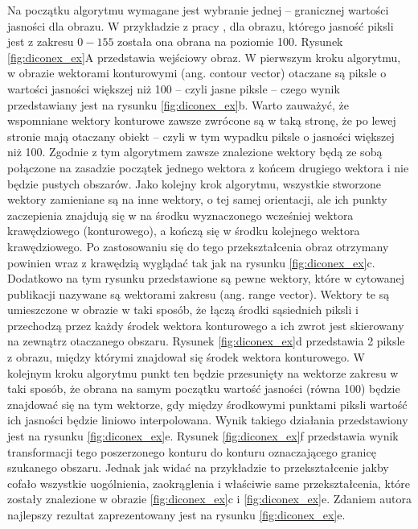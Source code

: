 Na początku algorytmu wymagane jest wybranie jednej -- granicznej wartości jasności dla obrazu. W przykładzie z pracy \cite{Schlei2009}, dla obrazu, którego jasność piksli jest z zakresu $0 - 155$ została ona obrana na poziomie 100. Rysunek \ref{fig:diconex_ex}A przedstawia wejściowy obraz. W pierwszym kroku algorytmu, w obrazie wektorami konturowymi (ang. contour vector) otaczane są piksle o wartości jasności większej niż 100 -- czyli jasne piksle -- czego wynik przedstawiany jest na rysunku \ref{fig:diconex_ex}b. Warto zauważyć, że wspomniane wektory konturowe zawsze zwrócone są w taką stronę, że po lewej stronie mają otaczany obiekt -- czyli w tym wypadku piksle o jasności większej niż 100. Zgodnie z tym algorytmem zawsze znalezione wektory będą ze sobą połączone na zasadzie początek jednego wektora z końcem drugiego wektora i nie będzie pustych obszarów. Jako kolejny krok algorytmu, wszystkie stworzone wektory zamieniane są na inne wektory, o tej samej orientacji, ale ich punkty zaczepienia znajdują się w na środku wyznaczonego wcześniej wektora krawędziowego (konturowego), a kończą się w środku kolejnego wektora krawędziowego. Po zastosowaniu się do tego przekształcenia obraz otrzymany powinien wraz z krawędzią wyglądać tak jak na rysunku \ref{fig:diconex_ex}c. Dodatkowo na tym rysunku przedstawione są pewne wektory, które w cytowanej publikacji nazywane są wektorami zakresu (ang. range vector). Wektory te są umieszczone w obrazie w taki sposób, że łączą środki sąsiednich piksli i przechodzą przez każdy środek wektora konturowego a ich zwrot jest skierowany na zewnątrz otaczanego obszaru. Rysunek \ref{fig:diconex_ex}d przedstawia 2 piksle z obrazu, między którymi znajdował się środek wektora konturowego. W kolejnym kroku algorytmu punkt ten będzie przesunięty na wektorze zakresu w taki sposób, że obrana na samym początku wartość jasności (równa 100) będzie znajdować się na tym wektorze, gdy między środkowymi punktami piksli wartość ich jasności będzie liniowo interpolowana. Wynik takiego działania przedstawiony jest na rysunku \ref{fig:diconex_ex}e. Rysunek \ref{fig:diconex_ex}f przedstawia wynik transformacji tego poszerzonego konturu do konturu oznaczającego granicę szukanego obszaru. Jednak jak widać na przykładzie to przekształcenie jakby cofało wszystkie uogólnienia, zaokrąglenia i właściwie same przekształcenia, które zostały znalezione w obrazie \ref{fig:diconex_ex}c i \ref{fig:diconex_ex}e. Zdaniem autora najlepszy rezultat zaprezentowany jest na rysunku \ref{fig:diconex_ex}e.\\

